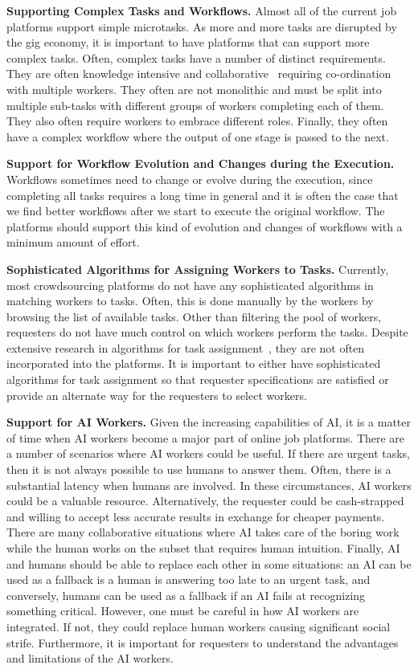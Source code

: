 \textbf{Supporting Complex Tasks and Workflows.}
Almost all of the current job platforms support simple microtasks.
As more and more tasks are disrupted by the gig economy, it is important to have platforms that can support more complex tasks.
Often, complex tasks have a number of distinct requirements.
They are often knowledge intensive and collaborative~\cite{rahman2015task} requiring co-ordination with multiple workers.
They often are not monolithic and must be split into multiple sub-tasks
with different groups of workers completing each of them.
They also often require workers to embrace different roles.
Finally, they often have a complex workflow where the output of one stage is passed to the next.

\textbf{Support for Workflow Evolution and Changes during the Execution.} Workflows sometimes
need to change or evolve during the execution, since completing all tasks requires a long time in
general and it is often the case that we find better workflows after we start to execute the
original workflow. The platforms should support this kind of evolution and changes of workflows
with a minimum amount of effort.

\textbf{Sophisticated Algorithms for Assigning Workers to Tasks.}
Currently, most crowdsourcing platforms do not have
any sophisticated algorithms in matching workers to tasks.
Often, this is done manually by the workers by browsing the list of available tasks.
Other than filtering the pool of workers, requesters do not have much control on which workers perform the tasks.
Despite extensive research in algorithms for task assignment~\cite{basu2015task,ho2012online,rahman2015task},
they are not often incorporated into the platforms.
It is important to either have sophisticated algorithms for task assignment so that requester specifications are satisfied or provide an alternate way for the requesters to select workers.

\textbf{Support for AI Workers.}
Given the increasing capabilities of AI, it is a matter of time when AI workers become a major part of online job platforms.
There are a number of scenarios where AI workers could be useful.
If there are urgent tasks, then it is not always possible to use humans to answer them.
Often, there is a substantial latency when humans are involved.
In these circumstances, AI workers could be a valuable resource.
Alternatively, the requester could be cash-strapped and willing to accept less
accurate results in exchange for cheaper payments.
There are many collaborative situations where AI takes care of the boring work
while the human works on the subset that requires human intuition.
Finally, AI and humans should be able to replace each other in some situations: an AI
can be used as a fallback is a human is answering too late to an urgent task, and
conversely, humans can be used as a fallback if an AI fails at recognizing something critical.
However, one must be careful in how AI workers are integrated.
If not, they could replace human workers causing significant social strife.
Furthermore, it is important for requesters to understand the advantages and limitations of the AI workers.


